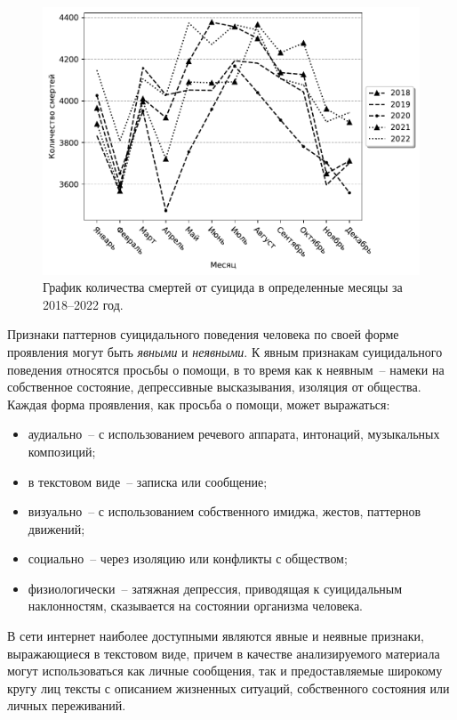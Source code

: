 \begin{figure}[H]
	\centering
	\includegraphics[width=1\textwidth]{inc/deathToMonthMonochrome.pdf}
	\caption{ График количества смертей от суицида в определенные месяцы за 2018--2022 год. }\label{img:cdcsuicides}
\end{figure}

Признаки паттернов суицидального поведения человека по своей форме проявления могут быть \textit{явными} и \textit{неявными}. К явным признакам суицидального поведения относятся просьбы о помощи, в то время как к неявным~-- намеки на собственное состояние, депрессивные высказывания, изоляция от общества. Каждая форма проявления, как просьба о помощи, может выражаться:

\begin{itemize}
	\item аудиально~-- с использованием речевого аппарата, интонаций, музыкальных композиций;
	\item в текстовом виде~-- записка или сообщение;
	\item визуально~-- с использованием собственного имиджа, жестов, паттернов движений;
	\item социально~-- через изоляцию или конфликты с обществом;
	\item физиологически~-- затяжная депрессия, приводящая к суицидальным наклонностям, сказывается на состоянии организма человека.
\end{itemize}

В сети интернет наиболее доступными являются явные и неявные признаки, выражающиеся в текстовом виде, причем в качестве анализируемого материала могут использоваться как личные сообщения, так и предоставляемые широкому кругу лиц тексты с описанием жизненных ситуаций, собственного состояния или личных переживаний.

